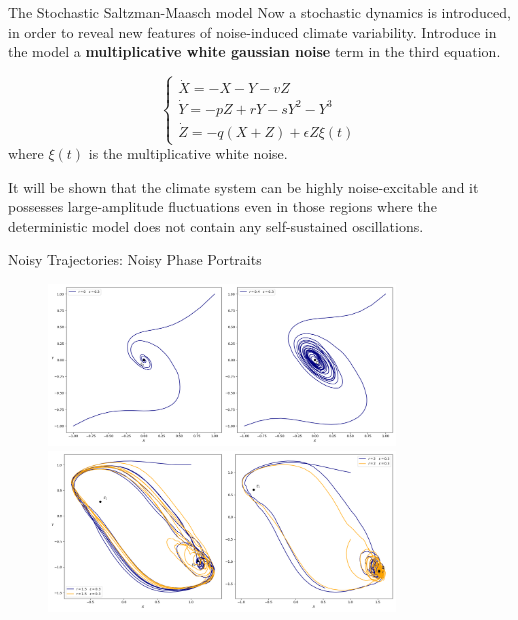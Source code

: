 \documentclass[10pt]{beamer}
\begin{document}
\begin{frame}{The Stochastic Saltzman-Maasch model}
	Now a stochastic dynamics is introduced, in order to reveal new features 
	of noise-induced climate variability. 
	Introduce in the model a \textbf{multiplicative white gaussian 
	noise} term in the third equation.

	\[
		\begin{cases}
			\dot{X} = -X -Y -vZ \\ 
			\dot{Y} = -pZ + rY -sY^2 -Y^3 \\
			\dot{Z} = -q(X+Z) + \epsilon Z \xi(t)
		\end{cases}
	\]
	where $\xi(t)$ is the multiplicative white noise.

	It will be shown that the climate system can be highly noise-excitable and it 
	possesses large-amplitude ﬂuctuations even in those regions where the 
	deterministic model does not contain any self-sustained oscillations.
\end{frame}

\begin{frame}{Noisy Trajectories: Noisy Phase Portraits}
	\begin{figure}
		\includegraphics[width=0.82\textwidth, height=0.7\textheight,keepaspectratio]{./figures_2/r0-0.4-eps0.3-trajectories.png}
		\includegraphics[width=0.82\textwidth, height=0.7\textheight,keepaspectratio]{./figures_2/r1.5-2-eps0.3-trajectories.png}
	\end{figure}
\end{frame}
\end{document}
